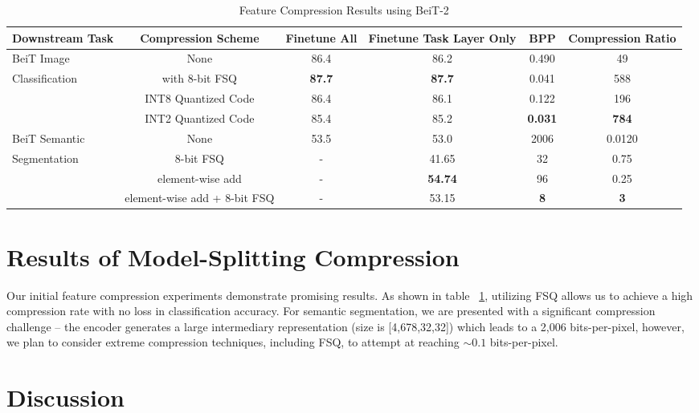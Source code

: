 \documentclass[10pt,twocolumn,letterpaper]{article}
\begin{document}
\begin{table}
\centering
\caption{Feature Compression Results using BeiT-2}
\label{tab:feature_compression_results}
\begin{tabular}{l|ccccc}
\toprule
Downstream Task & Compression Scheme & Finetune All & Finetune Task Layer Only & BPP & Compression Ratio \\
\midrule
\cmidrule(lr){1-5}
BeiT Image & None & 86.4 & 86.2 & 0.490 & 49 \\
  Classification & with 8-bit FSQ & \textbf{87.7} & \textbf{87.7} & 0.041 & 588 \\
&INT8 Quantized Code & 86.4 & 86.1 & 0.122 & 196 \\
&INT2 Quantized Code & 85.4 & 85.2 & \textbf{0.031} & \textbf{784} \\
\midrule
\cmidrule(lr){1-5}
BeiT Semantic & None & 53.5 & 53.0 & 2006 & 0.0120 \\
 Segmentation & 8-bit FSQ & - & 41.65 & 32 & 0.75 \\
  & element-wise add & - & \textbf{54.74} & 96 & 0.25 \\
  &  element-wise add + 8-bit FSQ & - & 53.15 & \textbf{8} & \textbf{3} \\
\bottomrule
\end{tabular}
\end{table}

\section{Results of Model-Splitting Compression}

Our initial feature compression experiments demonstrate promising results. As shown in table ~\ref{tab:feature_compression_results}, utilizing FSQ allows us to achieve a high compression rate with no loss in classification accuracy. For semantic segmentation, we are presented with a significant compression challenge -- the encoder generates a large intermediary representation (size is [4,678,32,32]) which leads to a 2,006 bits-per-pixel, however, we plan to consider extreme compression techniques, including FSQ, to attempt at reaching $\sim 0.1$ bits-per-pixel.
\section{Discussion}
\end{document}

